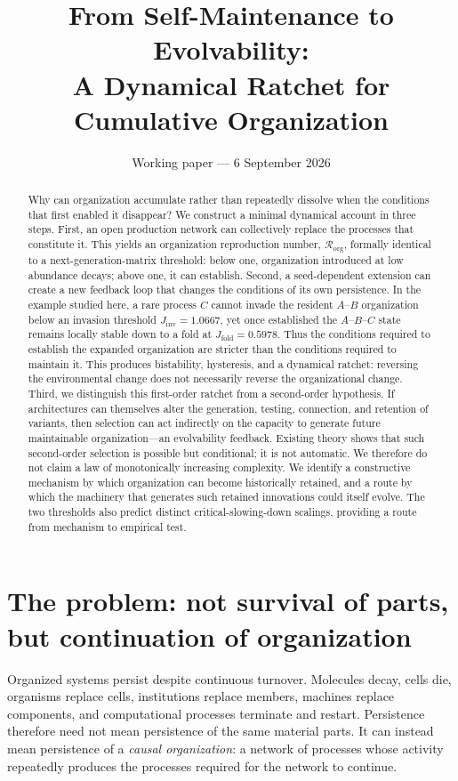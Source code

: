 \documentclass[11pt]{article}
\title{\textbf{From Self-Maintenance to Evolvability:\\A Dynamical Ratchet for Cumulative Organization}}
\author{}
\date{Working paper --- 6 September 2026}
\newcommand{\Rorg}{\mathcal R_{\mathrm{org}}}
\begin{document}
\maketitle

\begin{abstract}
Why can organization accumulate rather than repeatedly dissolve when the conditions that first enabled it disappear? We construct a minimal dynamical account in three steps. First, an open production network can collectively replace the processes that constitute it. This yields an organization reproduction number, $\Rorg$, formally identical to a next-generation-matrix threshold: below one, organization introduced at low abundance decays; above one, it can establish. Second, a seed-dependent extension can create a new feedback loop that changes the conditions of its own persistence. In the example studied here, a rare process $C$ cannot invade the resident $A$--$B$ organization below an invasion threshold $J_{\mathrm{inv}}=1.0667$, yet once established the $A$--$B$--$C$ state remains locally stable down to a fold at $J_{\mathrm{fold}}=0.5978$. Thus the conditions required to establish the expanded organization are stricter than the conditions required to maintain it. This produces bistability, hysteresis, and a dynamical ratchet: reversing the environmental change does not necessarily reverse the organizational change. Third, we distinguish this first-order ratchet from a second-order hypothesis. If architectures can themselves alter the generation, testing, connection, and retention of variants, then selection can act indirectly on the capacity to generate future maintainable organization---an evolvability feedback. Existing theory shows that such second-order selection is possible but conditional; it is not automatic. We therefore do not claim a law of monotonically increasing complexity. We identify a constructive mechanism by which organization can become historically retained, and a route by which the machinery that generates such retained innovations could itself evolve. The two thresholds also predict distinct critical-slowing-down scalings, providing a route from mechanism to empirical test.
\end{abstract}

\section{The problem: not survival of parts, but continuation of organization}

Organized systems persist despite continuous turnover. Molecules decay, cells die, organisms replace cells, institutions replace members, machines replace components, and computational processes terminate and restart. Persistence therefore need not mean persistence of the same material parts. It can instead mean persistence of a \emph{causal organization}: a network of processes whose activity repeatedly produces the processes required for the network to continue.
\end{document}
